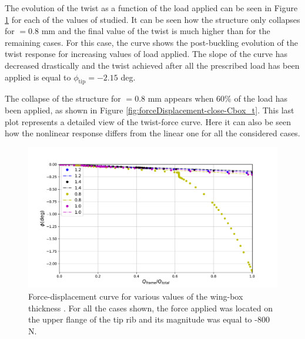     The evolution of the twist as a function of the load applied can be seen in Figure \ref{fig:forceDisplacement-far-Cbox_t} for each of the values of \boxt studied. It can be seen how the structure only collapses for \boxt$= 0.8$ mm and the final value of the twist is much higher than for the remaining cases. For this case, the curve shows the post-buckling evolution of the twist response for increasing values of load applied. The slope of the curve has decreased drastically and the twist achieved after all the prescribed load has been applied is equal to $\phi_{\mathrm{tip}} = -2.15$ deg.

    The collapse of the structure for \boxt$= 0.8$ mm appears when 60\% of the load has been applied, as shown in Figure \ref{fig:forceDisplacement-close-Cbox_t}. This last plot represents a detailed view of the twist-force curve. Here it can also be seen how the nonlinear response differs from the linear one for all the considered cases.

    \begin{figure}[!htpb] %
      \centering
      \includegraphics[width=0.8 \textwidth]{../figures/result-sim/cbox/force_displacement-far}
      \caption[Force-displacement curve for various values of the wing-box thickness]{Force-displacement curve for various values of the wing-box thickness \boxt. For all the cases shown, the force applied was located on the upper flange of the tip rib and its magnitude was equal to -800 N.}\label{fig:forceDisplacement-far-Cbox_t}
    \end{figure}

